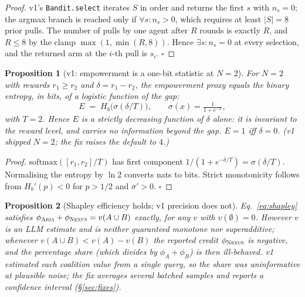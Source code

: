 \documentclass[11pt]{article}
\newcommand{\code}[1]{\texttt{\small #1}}
\newcommand{\ARIA}{\textsc{Aria}}
\newcommand{\NEXUS}{\textsc{Nexus}}
\theoremstyle{plain}
\newtheorem{proposition}{Proposition}
\theoremstyle{definition}
\begin{document}
\begin{proof}
v1's \code{Bandit.select} iterates $S$ in order and returns the first $s$ with
$n_s = 0$; the argmax branch is reached only if $\forall s: n_s > 0$, which
requires at least $|S| = 8$ prior pulls. The number of pulls by one agent after
$R$ rounds is exactly $R$, and $R \le 8$ by the clamp $\max(1,\min(R,8))$. Hence
$\exists s: n_s = 0$ at every selection, and the returned arm at the $i$-th pull
is $s_i$. \hfill$\square$
\end{proof}

\begin{proposition}[v1: empowerment is a one-bit statistic at $N=2$]
\label{prop:emp}
For $N = 2$ with rewards $r_1 \ge r_2$ and $\delta = r_1 - r_2$, the empowerment
proxy equals the binary entropy, in bits, of a logistic function of the gap:
\begin{equation}
E \;=\; H_b\!\big(\sigma(\delta/T)\big), \qquad \sigma(x) = \tfrac{1}{1+e^{-x}},
\end{equation}
with $T = 2$. Hence $E$ is a strictly decreasing function of $\delta$ alone: it
is invariant to the reward level, and carries no information beyond the gap.
$E = 1$ iff $\delta = 0$. (v1 shipped $N=2$; the fix raises the default to $4$.)
\end{proposition}

\begin{proof}
$\mathrm{softmax}([r_1,r_2]/T)$ has first component
$1/(1+e^{-\delta/T}) = \sigma(\delta/T)$. Normalising the entropy by $\ln 2$
converts nats to bits. Strict monotonicity follows from $H_b'(p) < 0$ for
$p > 1/2$ and $\sigma' > 0$. \hfill$\square$
\end{proof}

\begin{proposition}[Shapley efficiency holds; v1 precision does not]
\label{prop:shapley}
Eq.~\ref{eq:shapley} satisfies $\phi_{\ARIA{}} + \phi_{\NEXUS{}} = v(A\cup B)$
exactly, for any $v$ with $v(\emptyset)=0$. However $v$ is an LLM estimate and is
neither guaranteed monotone nor superadditive; whenever
$v(A\cup B) < v(A) - v(B)$ the reported credit $\phi_{\NEXUS{}}$ is negative, and
the percentage share (which divides by $\phi_A + \phi_B$) is then ill-behaved.
v1 estimated each coalition value from a \emph{single} query, so the share was
uninformative at plausible noise; the fix averages several batched samples and
reports a confidence interval (\S\ref{sec:fixes}).
\end{proposition}
\end{document}
